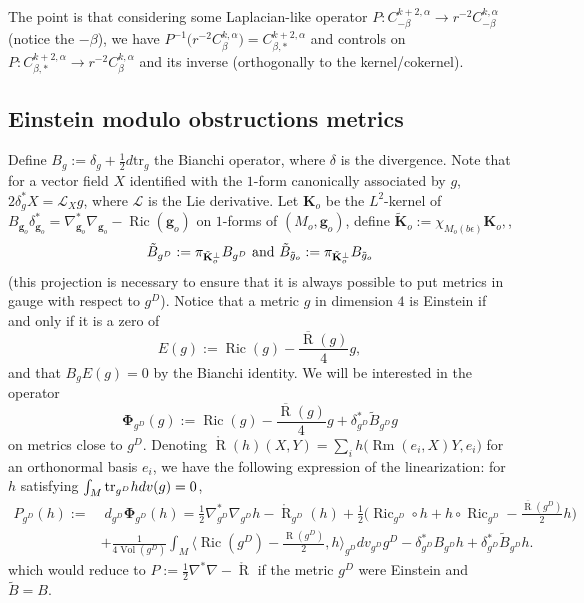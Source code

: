 \documentclass[12pt]{article}
\DeclareMathOperator{\Rm}{\operatorname{Rm}}
\DeclareMathOperator{\R}{\operatorname{R}}
\DeclareMathOperator{\vol}{\operatorname{Vol}}
\DeclareMathOperator{\Ric}{\operatorname{Ric}}
\begin{document}
The point is that considering some Laplacian-like operator $P: C^{k+2,\alpha}_{-\beta} \to r^{-2}C^{k,\alpha}_{-\beta}$ (notice the $-\beta$), we have $P^{-1}\big(r^{-2}C^{k,\alpha}_{\beta}\big) = C^{k+2,\alpha}_{\beta,*}$ and controls on $P: C^{k+2,\alpha}_{\beta,*}\to r^{-2}C^{k,\alpha}_{\beta}$ and its inverse (orthogonally to the kernel/cokernel).

\subsection{Einstein modulo obstructions metrics}
    
    Define $B_{g}:= \delta_g+\frac{1}{2} d\mathrm{tr}_g$ the Bianchi operator, where $\delta$ is the divergence. Note that for a vector field $X$ identified with the $1$-form canonically associated by $g$, $2\delta^*_g X = \mathcal{L}_Xg$, where $\mathcal{L}$ is the Lie derivative. Let $\mathbf{K}_o$ be the $L^2$-kernel of $B_{\mathbf{g}_o}\delta_{\mathbf{g}_o}^* = \nabla_{\mathbf{g}_o}^*\nabla_{\mathbf{g}_o}-\Ric(\mathbf{g}_o)$ on $1$-forms of $(M_o,\mathbf{g}_o)$, define
    $\tilde{\mathbf{K}}_o:= \chi_{M_o(b\epsilon)}\mathbf{K}_o,$, 
    $$\tilde{B}_{g^D}:= \pi_{\tilde{\mathbf{K}}_o^\perp}B_{g^D}\textup{ and }\tilde{B}_{\tilde{g}_o}:= \pi_{\tilde{\mathbf{K}}_o^\perp}B_{\tilde{g}_o}$$
    (this projection is necessary to ensure that it is always possible to put metrics in gauge with respect to $g^D$). Notice that a metric $g$ in dimension $4$ is Einstein if and only if it is a zero of $$E(g):= \Ric(g)-\frac{\overline{\R}(g)}{4}g,$$
    and that $B_gE(g)= 0$ by the Bianchi identity. We will be interested in the operator
    $$\mathbf{\Phi}_{g^D}(g):= \Ric(g)-\frac{\overline{\R}(g)}{4}g + \delta_{g^D}^*\tilde{B}_{g^D}g$$
    on metrics close to $g^D$. Denoting $\mathring{\R}(h)(X,Y)= \sum_i h\big(\Rm(e_i,X)Y,e_i\big)$ for an orthonormal basis $e_i$, we have the following expression of the linearization: for $h$ satisfying $\int_M\textup{tr}_{g^D}h dv(g)=0$,
    \begin{align}
    P_{{g^D}}(h):=& \;d_{g^D}\mathbf{\Phi}_{g^D}(h) = \frac{1}{2}\nabla^*_{g^D}\nabla_{g^D} h  -\mathring{\R}_{g^D}(h)+\frac{1}{2}\Big(\Ric_{g^D}\circ h+h\circ \Ric_{g^D} - \frac{\overline{\R}({g^D})}{2}h\Big)\nonumber\\
    &+ \frac{1}{4\vol({g^D})}\int_M\Big\langle\Ric({g^D})-\frac{\R({g^D})}{2}, h\Big\rangle_{g^D} dv_{g^D}{g^D} - \delta_{{g^D}}^*B_{g^D}h+\delta^*_{g^D}\tilde{B}_{g^D} h.\label{bar P g}
    \end{align}
    which would reduce to $ P:=  \frac{1}{2}\nabla^*\nabla  -\mathring{\R} $ if the metric $g^D$ were Einstein and $\tilde{B} = B$.
    
\end{document}
